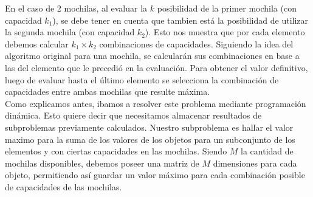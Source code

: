 
  En el caso de 2 mochilas, al evaluar la $k$ posibilidad de la primer mochila (con capacidad $k_{1}$), se debe tener en cuenta que tambien está la posibilidad de utilizar la segunda mochila (con capacidad $k_{2}$). Esto nos muestra que por cada elemento debemos calcular $k_{1} \times k_{2}$ combinaciones de capacidades. Siguiendo la idea del algoritmo original para una mochila, se calcularán sus combinaciones en base a las del elemento que le precedió en la evaluación. Para obtener el valor definitivo, luego de evaluar hasta el último elemento se selecciona la combinación de capacidades entre ambas mochilas que resulte máxima.\\
 
Como explicamos antes, ibamos a resolver este problema mediante programación dinámica. Esto quiere decir que necesitamos almacenar resultados de subproblemas previamente calculados. Nuestro subproblema es hallar el valor maximo para la suma de los valores de los objetos para un subconjunto de los elementos y con ciertas capacidades en las mochilas.
Siendo $M$ la cantidad de mochilas disponibles, debemos poseer una matriz de $M$ dimensiones para cada objeto, permitiendo así guardar un valor máximo para cada combinación posible de capacidades de las mochilas.

